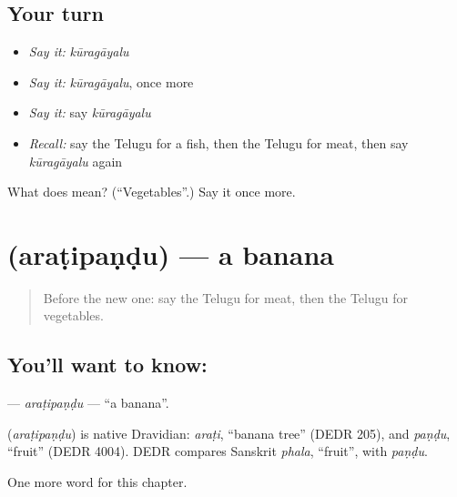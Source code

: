 \subsection*{Your turn}
\begin{itemize}
\raggedright
  \item \emph{Say it:} \emph{kūragāyalu}
  \item \emph{Say it:} \emph{kūragāyalu}, once more
  \item \emph{Say it:} say \emph{kūragāyalu}
  \item \emph{Recall:} say the Telugu for a fish, then the Telugu for meat, then say \emph{kūragāyalu} again
\end{itemize}

\begin{tcolorbox}[breakable,colback=teal!4,colframe=teal!35!black,title={Before you move on}]
What does  mean? (\textquotedblleft{}Vegetables\textquotedblright{}.) Say it once more.
\end{tcolorbox}
\section[\texorpdfstring{\te{అరటిపండు} (araṭipaṇḍu)}{అరటిపండు (araṭipaṇḍu)}]{ (araṭipaṇḍu) — a banana}

\label{lesson:TE-C117-aratipandu}



\begin{quote}
Before the new one: say the Telugu for meat, then the Telugu for vegetables.
\end{quote}

\subsection*{You'll want to know: }
\textbf{} — \emph{araṭipaṇḍu} — \textquotedblleft{}a banana\textquotedblright{}.

\begin{cousinweb}
\textbf{} (\emph{araṭipaṇḍu}) is native Dravidian: \emph{araṭi}, \textquotedblleft{}banana tree\textquotedblright{} (DEDR 205), and \emph{paṇḍu}, \textquotedblleft{}fruit\textquotedblright{} (DEDR 4004). DEDR compares Sanskrit \emph{phala}, \textquotedblleft{}fruit\textquotedblright{}, with \emph{paṇḍu}.
\end{cousinweb}

\begin{grammarlens}[title={What you've built}]
One more word for this chapter.
\end{grammarlens}

